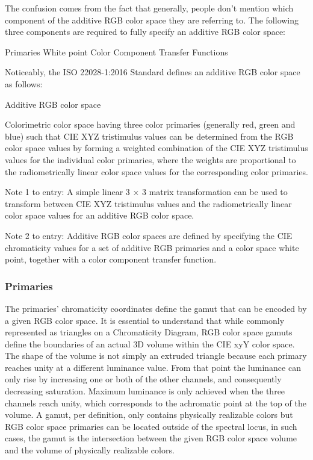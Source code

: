 The confusion comes from the fact that generally, people don't mention which component of the additive RGB color space they are referring to. The following three components are required to fully specify an additive RGB color space:

Primaries
White point
Color Component Transfer Functions

Noticeably, the ISO 22028-1:2016 Standard defines an additive RGB color space as follows:

	Additive RGB color space

Colorimetric color space having three color primaries (generally red, green and blue) such that CIE XYZ tristimulus values can be determined from the RGB color space values by forming a weighted combination of the CIE XYZ tristimulus values for the individual color primaries, where the weights are proportional to the radiometrically linear color space values for the corresponding color primaries.

Note 1 to entry: A simple linear 3 × 3 matrix transformation can be used to transform between CIE XYZ tristimulus values and the radiometrically linear color space values for an additive RGB color space.

Note 2 to entry: Additive RGB color spaces are defined by specifying the CIE chromaticity values for a set of additive RGB primaries and a color space white point, together with a color component transfer function.

\subsubsection{Primaries}

The primaries’ chromaticity coordinates define the gamut that can be encoded by a given RGB color space. It is essential to understand that while commonly represented as triangles on a Chromaticity Diagram, RGB color space gamuts define the boundaries of an actual 3D volume within the CIE xyY color space. The shape of the volume is not simply an extruded triangle because each primary reaches unity at a different luminance value. From that point the luminance can only rise by increasing one or both of the other channels, and consequently decreasing saturation. Maximum luminance is only achieved when the three channels reach unity, which corresponds to the achromatic point at the top of the volume.
A gamut, per definition, only contains physically realizable colors but RGB color space primaries can be located outside of the spectral locus, in such cases, the gamut is the intersection between the given RGB color space volume and the volume of physically realizable colors.

